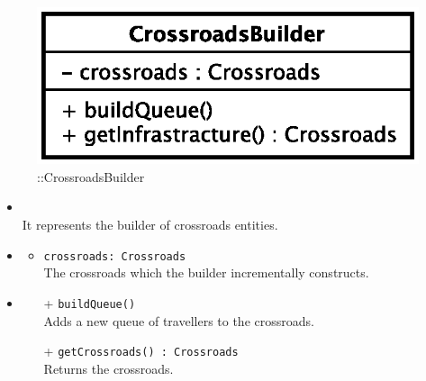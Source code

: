 \begin{figure}[h]
\centering
\includegraphics[scale=0.6,keepaspectratio]{images/solution/app/backend/crossroads_builder.eps}
\caption{\pReactiveBuild::CrossroadsBuilder}
\label{fig:sd-app-crossroads_builder}
\end{figure}
\FloatBarrier
\begin{itemize}
  \item \textbf{\descr} \\
    It represents the builder of crossroads entities. 
    \item \textbf{\attrs}
  \begin{itemize}
    \item \texttt{crossroads: Crossroads} \\
The crossroads which the builder incrementally constructs.
  \end{itemize}
  \item \textbf{\ops}
  \begin{itemize} 
    \item[+] \texttt{buildQueue()} \\
Adds a new queue of travellers to the crossroads.
    \item[+] \texttt{getCrossroads() : Crossroads} \\
Returns the crossroads.
  \end{itemize}
\end{itemize}
